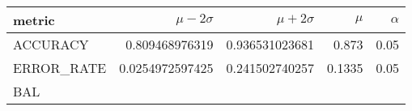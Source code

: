 \documentclass[11pt]{report}
\begin{document}
\begin{table}
    \centering
    \begin{tabular}{lrrrr}
    \hline
    
        \textbf{ metric }
        
           &
        
    
        \textbf{ $\mu - 2\sigma$ }
        
           &
        
    
        \textbf{ $\mu + 2\sigma$ }
        
           &
        
    
        \textbf{ $\mu$ }
        
           &
        
    
        \textbf{ $\alpha$ }
        
     
    \\
    \hline
    
        
            ACCURACY
             
               &
            
        
            0.809468976319
             
               &
            
        
            0.936531023681
             
               &
            
        
            0.873
             
               &
            
        
            0.05
            
        
        \\
    
        
            ERROR\_RATE
             
               &
            
        
            0.0254972597425
             
               &
            
        
            0.241502740257
             
               &
            
        
            0.1335
             
               &
            
        
            0.05
            
        
        \\
    
        
            BAL
             

\end{tabular}
\end{table}
\end{document}
